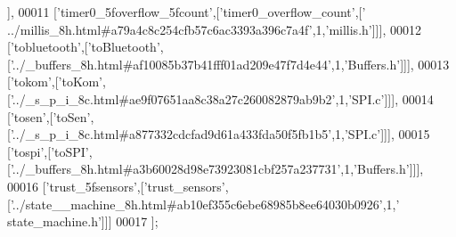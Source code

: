 \begin{DoxyCode}
      ],
00011   [\textcolor{stringliteral}{'timer0\_5foverflow\_5fcount'},[\textcolor{stringliteral}{'timer0\_overflow\_count'},[\textcolor{stringliteral}{'
      ../millis\_8h.html#a79a4c8c254cfb57c6ac3393a396c7a4f'},1,\textcolor{stringliteral}{'millis.h'}]]],
00012   [\textcolor{stringliteral}{'tobluetooth'},[\textcolor{stringliteral}{'toBluetooth'},[\textcolor{stringliteral}{'../\_buffers\_8h.html#af10085b37b41fff01ad209e47f7d4e44'},1,\textcolor{stringliteral}{'Buffers.h'}]]],
00013   [\textcolor{stringliteral}{'tokom'},[\textcolor{stringliteral}{'toKom'},[\textcolor{stringliteral}{'../\_s\_p\_i\_8c.html#ae9f07651aa8c38a27c260082879ab9b2'},1,\textcolor{stringliteral}{'SPI.c'}]]],
00014   [\textcolor{stringliteral}{'tosen'},[\textcolor{stringliteral}{'toSen'},[\textcolor{stringliteral}{'../\_s\_p\_i\_8c.html#a877332cdcfad9d61a433fda50f5fb1b5'},1,\textcolor{stringliteral}{'SPI.c'}]]],
00015   [\textcolor{stringliteral}{'tospi'},[\textcolor{stringliteral}{'toSPI'},[\textcolor{stringliteral}{'../\_buffers\_8h.html#a3b60028d98e73923081cbf257a237731'},1,\textcolor{stringliteral}{'Buffers.h'}]]],
00016   [\textcolor{stringliteral}{'trust\_5fsensors'},[\textcolor{stringliteral}{'trust\_sensors'},[\textcolor{stringliteral}{'../state\_\_machine\_8h.html#ab10ef355c6ebe68985b8ee64030b0926'},1,\textcolor{stringliteral}{'
      state\_machine.h'}]]]
00017 ];
\end{DoxyCode}
